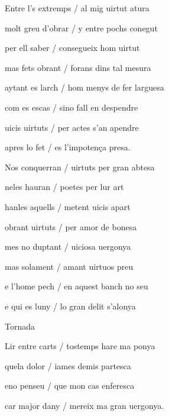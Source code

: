 \documentclass[12pt]{article}
\begin{document}
\begin{estrofa}

 Entre l's extremps / al mig uirtut atura

 molt greu d'obrar / y entre pochs conegut

 per ell saber / consegueix hom uirtut

 mas fets obrant / forans dins tal mesura

 aytant es larch / hom menys de fer larguesa

 com es escas / sino fall en despendre

 uicis uirtuts / per actes s'an apendre

 apres lo fet / es l'impoten\c{c}a presa.

\end{estrofa}



\begin{estrofa}

 Nos conquerran / uirtuts per gran abtesa

 neles hauran / poetes per lur art

 hanles aquells / metent uicis apart

 obrant uirtuts / per amor de bonesa

 mes no duptant / uiciosa uergonya

 mas solament / amant uirtuos preu

 e l'home pech / en aquest banch no seu

 e qui es luny / lo gran delit s'alonya

\end{estrofa}


\begin{estrofaExtra}%




\begin{tornada}

\pagina{[48v]} Tornada

\end{tornada}


\end{estrofaExtra}


\begin{estrofa}

 Lir entre carts / tostemps hare ma ponya

 quela dolor / iames demis partesca

 eno penseu / que mon cas enferesca

 car major dany / mereix ma gran uergonya.

\end{estrofa}
\end{document}
